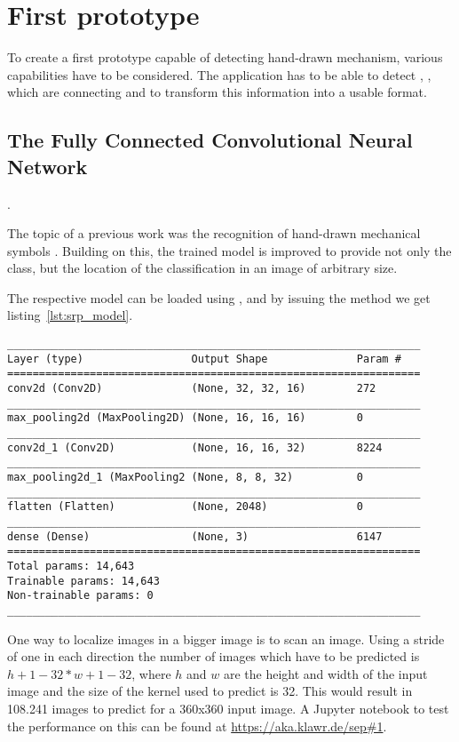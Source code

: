 \section{First prototype} \label{ch:first_prototype}

To create a first prototype capable of detecting hand-drawn mechanism, various capabilities have to be considered.
The application has to be able to detect , , which are connecting  and to transform this information into a usable format.

\subsection{The Fully Connected Convolutional Neural Network}.

The topic of a previous work was the recognition of hand-drawn mechanical symbols \cite{Lawrence2020}.
Building on this, the trained model is improved to provide not only the class, but the location of the classification in an image of arbitrary size.

The respective model can be loaded using , %
 and by issuing the  method we get listing~\ref{lst:srp_model}.

\begin{lstlisting}[caption={Summary of Symbol Classifier}, label={lst:srp_model}]
_________________________________________________________________
Layer (type)                 Output Shape              Param #
=================================================================
conv2d (Conv2D)              (None, 32, 32, 16)        272
_________________________________________________________________
max_pooling2d (MaxPooling2D) (None, 16, 16, 16)        0
_________________________________________________________________
conv2d_1 (Conv2D)            (None, 16, 16, 32)        8224
_________________________________________________________________
max_pooling2d_1 (MaxPooling2 (None, 8, 8, 32)          0
_________________________________________________________________
flatten (Flatten)            (None, 2048)              0
_________________________________________________________________
dense (Dense)                (None, 3)                 6147
=================================================================
Total params: 14,643
Trainable params: 14,643
Non-trainable params: 0
_________________________________________________________________
\end{lstlisting}

One way to localize images in a bigger image is to scan an image.
Using a stride of one in each direction the number of images which have to be predicted is $h + 1 - 32 * w + 1 - 32$, where $h$ and $w$ are the height and width of the input image and the size of the kernel used to predict is 32.
This would result in 108.241 images to predict for a 360x360 input image.
A Jupyter notebook to test the performance on this can be found at \url{https://aka.klawr.de/sep#1}. %

